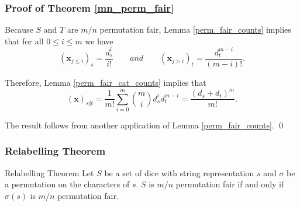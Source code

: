 \documentclass[aspectratio=169]{beamer}
\begin{document}
\begin{frame}[triangle=siiblue]
\frametitle{Proof of Theorem \ref{mn_perm_fair}}
Because $S$ and $T$ are $m/n$ permutation fair,  Lemma \ref{perm_fair_counts} implies that for all $0 \leq i \leq m$ we have
\begin{equation*}
	(\mathbf{x}_{j\leq i})_s = \frac{d_s^i}{i!}  \qquad and \qquad (\mathbf{x}_{j > i})_t = \frac{d_t^{m-i}}{(m-i)!}.
\end{equation*}

\vfill

Therefore,  Lemma \ref{perm_fair_cat_counts} implies that
\begin{equation*}
(\mathbf{x})_{s \Vert t} = \frac{1}{m!} \sum_{i=0}^m \binom{m}{i} d_s^i d_t^{m-i} = \frac{(d_s + d_t)^m}{m!}. 
\end{equation*}

The result follows from another application of Lemma \ref{perm_fair_counts}.  \qed
\end{frame}

\begin{frame}[triangle=siiblue]
\frametitle{Relabelling Theorem}
\begin{siitheorem}[label=relabelling]{Relabelling Theorem}{}
Let $S$ be a set of dice with string representation $s$ and $\sigma$ be a permutation on the characters of $s$.  $S$ is $m/n$ permutation fair if and only if $\sigma(s)$ is $m/n$ permutation fair.
\end{siitheorem}

\end{frame}
\end{document}
